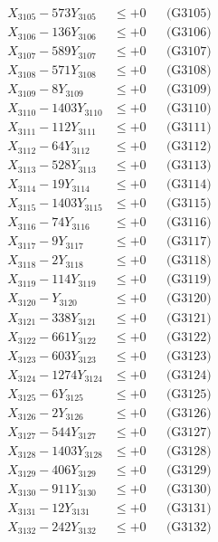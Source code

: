 \documentclass[a4paper,10pt]{article}
\begin{document}
{\begin{align}
X_{3105} - 573Y_{3105} &\leq +0 && \text{(G3105)} \\
X_{3106} - 136Y_{3106} &\leq +0 && \text{(G3106)} \\
X_{3107} - 589Y_{3107} &\leq +0 && \text{(G3107)} \\
X_{3108} - 571Y_{3108} &\leq +0 && \text{(G3108)} \\
X_{3109} - 8Y_{3109} &\leq +0 && \text{(G3109)} \\
X_{3110} - 1403Y_{3110} &\leq +0 && \text{(G3110)} \\
\allowbreak
X_{3111} - 112Y_{3111} &\leq +0 && \text{(G3111)} \\
X_{3112} - 64Y_{3112} &\leq +0 && \text{(G3112)} \\
X_{3113} - 528Y_{3113} &\leq +0 && \text{(G3113)} \\
X_{3114} - 19Y_{3114} &\leq +0 && \text{(G3114)} \\
X_{3115} - 1403Y_{3115} &\leq +0 && \text{(G3115)} \\
X_{3116} - 74Y_{3116} &\leq +0 && \text{(G3116)} \\
X_{3117} - 9Y_{3117} &\leq +0 && \text{(G3117)} \\
X_{3118} - 2Y_{3118} &\leq +0 && \text{(G3118)} \\
X_{3119} - 114Y_{3119} &\leq +0 && \text{(G3119)} \\
X_{3120} - Y_{3120} &\leq +0 && \text{(G3120)} \\
\allowbreak
X_{3121} - 338Y_{3121} &\leq +0 && \text{(G3121)} \\
X_{3122} - 661Y_{3122} &\leq +0 && \text{(G3122)} \\
X_{3123} - 603Y_{3123} &\leq +0 && \text{(G3123)} \\
X_{3124} - 1274Y_{3124} &\leq +0 && \text{(G3124)} \\
X_{3125} - 6Y_{3125} &\leq +0 && \text{(G3125)} \\
X_{3126} - 2Y_{3126} &\leq +0 && \text{(G3126)} \\
X_{3127} - 544Y_{3127} &\leq +0 && \text{(G3127)} \\
X_{3128} - 1403Y_{3128} &\leq +0 && \text{(G3128)} \\
X_{3129} - 406Y_{3129} &\leq +0 && \text{(G3129)} \\
X_{3130} - 911Y_{3130} &\leq +0 && \text{(G3130)} \\
\allowbreak
X_{3131} - 12Y_{3131} &\leq +0 && \text{(G3131)} \\
X_{3132} - 242Y_{3132} &\leq +0 && \text{(G3132)} \\

\end{align}}
\end{document}

